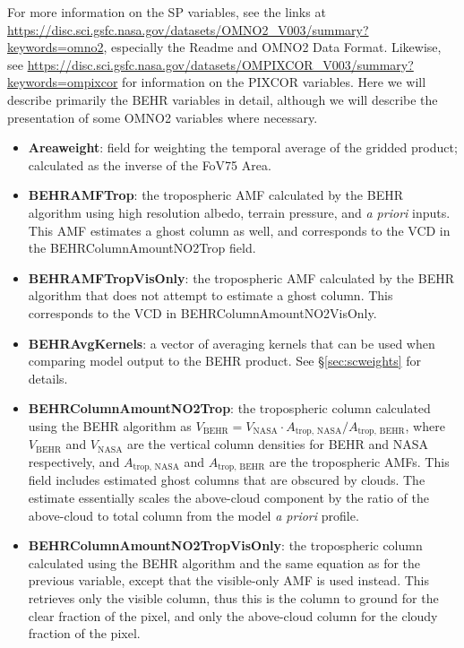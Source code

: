 \documentclass[12pt]{article}
\begin{document}
	For more information on the SP variables, see the links at \url{https://disc.sci.gsfc.nasa.gov/datasets/OMNO2_V003/summary?keywords=omno2}, especially the Readme and OMNO2 Data Format. Likewise, see \url{https://disc.sci.gsfc.nasa.gov/datasets/OMPIXCOR_V003/summary?keywords=ompixcor} for information on the PIXCOR variables.  Here we will describe primarily the BEHR variables in detail, although we will describe the presentation of some OMNO2 variables where necessary.
	
	\begin{itemize}
	\item \textbf{Areaweight}: field for weighting the temporal average of the gridded product; calculated as the inverse of the FoV75 Area.	
	
	\item \textbf{BEHRAMFTrop}: the tropospheric AMF calculated by the BEHR algorithm using high resolution albedo, terrain pressure, and  \emph{a priori} inputs.  This AMF estimates a ghost column as well, and corresponds to the VCD in the BEHRColumnAmountNO2Trop field.
	
	\item \textbf{BEHRAMFTropVisOnly}: the tropospheric AMF calculated by the BEHR algorithm that does not attempt to estimate a ghost column. This corresponds to the VCD in BEHRColumnAmountNO2VisOnly.
	
	\item \textbf{BEHRAvgKernels}: a vector of averaging kernels that can be used when comparing model output to the BEHR product. See \S\ref{sec:scweights} for details.
	
	\item \textbf{BEHRColumnAmountNO2Trop}: the tropospheric  column calculated using the BEHR algorithm as $V_{\mathrm{BEHR}} = V_{\mathrm{NASA}} \cdot A_{\text{trop, NASA}} / A_{\text{trop, BEHR}}$, where $V_{\mathrm{BEHR}}$ and $V_{\mathrm{NASA}}$ are the vertical column densities for BEHR and NASA respectively, and $A_{\text{trop, NASA}}$ and $A_{\text{trop, BEHR}}$ are the tropospheric AMFs.  This field includes estimated ghost columns that are obscured by clouds. The estimate essentially scales the above-cloud component by the ratio of the above-cloud to total column from the model \emph{a priori} profile.
	
	\item \textbf{BEHRColumnAmountNO2TropVisOnly}: the tropospheric  column calculated using the BEHR algorithm and the same equation as for the previous variable, except that the visible-only AMF is used instead. This retrieves only the visible  column, thus this is the  column to ground for the clear fraction of the pixel, and only the above-cloud  column for the cloudy fraction of the pixel.
	

\end{itemize}
\end{document}
